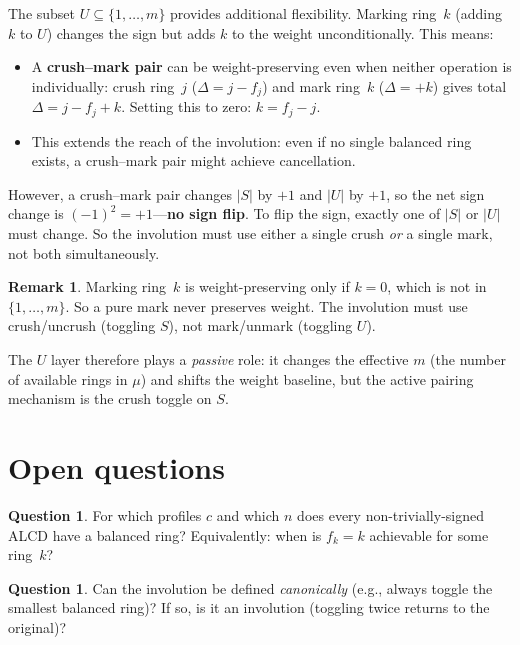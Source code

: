 \documentclass[11pt]{article}
\theoremstyle{plain}
\theoremstyle{definition}
\newtheorem{remark}[theorem]{Remark}
\newtheorem{question}[theorem]{Question}
\begin{document}
The subset $U \subseteq \{1, \ldots, m\}$ provides
additional flexibility.  Marking ring~$k$ (adding $k$ to $U$)
changes the sign but adds $k$ to the weight unconditionally.
This means:

\begin{itemize}
  \item A \textbf{crush--mark pair} can be weight-preserving
    even when neither operation is individually:
    crush ring~$j$ ($\Delta = j - f_j$) and mark ring~$k$
    ($\Delta = +k$) gives total $\Delta = j - f_j + k$.
    Setting this to zero: $k = f_j - j$.
  \item This extends the reach of the involution: even if
    no single balanced ring exists, a crush--mark pair might
    achieve cancellation.
\end{itemize}

However, a crush--mark pair changes $|S|$ by $+1$ and
$|U|$ by $+1$, so the net sign change is
$(-1)^2 = +1$---\textbf{no sign flip}.
To flip the sign, exactly one of $|S|$ or $|U|$ must
change.  So the involution must use either a single crush
\emph{or} a single mark, not both simultaneously.

\begin{remark}
Marking ring~$k$ is weight-preserving only if $k = 0$,
which is not in $\{1, \ldots, m\}$.  So a pure mark
never preserves weight.  The involution must use
crush/uncrush (toggling $S$), not mark/unmark
(toggling $U$).

The $U$ layer therefore plays a \emph{passive} role:
it changes the effective $m$ (the number of available
rings in $\mu$) and shifts the weight baseline, but
the active pairing mechanism is the crush toggle on $S$.
\end{remark}


\section{Open questions}

\begin{question}
For which profiles $c$ and which $n$ does every
non-trivially-signed ALCD have a balanced ring?
Equivalently: when is $f_k = k$ achievable for some
ring~$k$?
\end{question}

\begin{question}
Can the involution be defined \emph{canonically}
(e.g., always toggle the smallest balanced ring)?
If so, is it an involution (toggling twice returns to
the original)?
\end{question}
\end{document}

